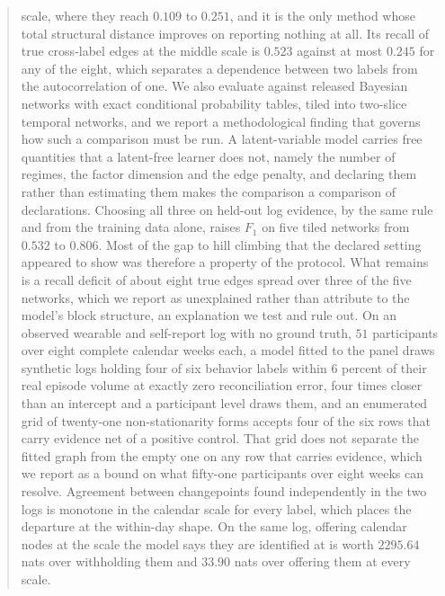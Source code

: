 \documentclass[letterpaper,10pt]{article}
\begin{document}
\begin{abstract}
scale, where they reach $0.109$ to $0.251$, and it is the only method whose
total structural distance improves on reporting nothing at all. Its recall of
true cross-label edges at the middle scale is $0.523$ against at most $0.245$
for any of the eight, which separates a dependence between two labels from the
autocorrelation of one. We also evaluate
against released Bayesian networks with exact conditional probability tables,
tiled into two-slice temporal networks, and we report a methodological finding
that governs how such a comparison must be run. A latent-variable model carries
free quantities that a latent-free learner does not, namely the number of
regimes, the factor dimension and the edge penalty, and declaring them rather
than estimating them makes the comparison a comparison of declarations. Choosing
all three on held-out log evidence, by the same rule and from the training data
alone, raises $F_1$ on five tiled networks from $0.532$ to $0.806$. Most of the
gap to hill climbing that the declared setting appeared to show was therefore a
property of the protocol. What remains is a recall deficit of about eight true
edges spread over three of the five networks, which we report as unexplained
rather than attribute to the model's block structure, an explanation we test
and rule out. On an observed wearable and self-report log with no ground truth,
$51$ participants over eight complete calendar weeks each, a model fitted to
the panel draws synthetic logs holding four of six behavior labels within $6$
percent of their real episode volume at exactly zero reconciliation error,
four times closer than an intercept and a participant level draws them, and an
enumerated grid of twenty-one non-stationarity forms accepts four of the six
rows that carry evidence net of a positive control. That grid does not separate
the fitted graph from the empty one on any row that carries evidence, which we
report as a bound on what fifty-one participants over eight weeks can resolve.
Agreement between changepoints found independently in the two logs is monotone
in the calendar scale for every label, which places the departure at the
within-day shape. On the same log, offering calendar nodes at the scale the
model says they are identified at is worth $2295.64$ nats over withholding them
and $33.90$ nats over offering them at every scale.
\end{abstract}




\clearpage








\end{document}

